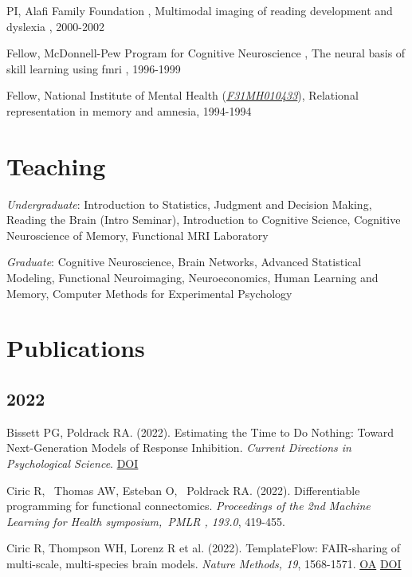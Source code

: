 \documentclass[10pt, letterpaper]{article}
\begin{document}
PI, Alafi Family Foundation , Multimodal imaging of reading development and dyslexia , 2000-2002\vspace{2mm}

Fellow, McDonnell-Pew Program for Cognitive Neuroscience , The neural basis of skill learning using fmri , 1996-1999\vspace{2mm}

Fellow, National Institute of Mental Health  (\href{http://projectreporter.nih.gov/project_info_description.cfm?aid=2241597}{\textit{F31MH010433}}), Relational representation in memory and amnesia, 1994-1994\vspace{2mm}


\section*{Teaching}
\noindent
\textit{Undergraduate}: Introduction to Statistics, Judgment and Decision Making, Reading the Brain (Intro Seminar), Introduction to Cognitive Science, Cognitive Neuroscience of Memory, Functional MRI Laboratory\vspace{2mm}

\textit{Graduate}: Cognitive Neuroscience, Brain Networks, Advanced Statistical Modeling, Functional Neuroimaging, Neuroeconomics, Human Learning and Memory, Computer Methods for Experimental Psychology\vspace{2mm}


\section*{Publications}
\noindent
\subsection*{2022}Bissett PG, Poldrack RA.  (2022). Estimating the Time to Do Nothing: Toward Next-Generation Models of Response Inhibition. \textit{Current Directions in Psychological Science}. \href{https://doi.org/10.1177/09637214221121753}{DOI} \vspace{2mm}

Ciric R,  Thomas AW, Esteban O,  Poldrack RA.  (2022). Differentiable programming for functional connectomics. \textit{Proceedings of the 2nd Machine Learning for Health symposium, PMLR , 193.0}, 419-455. \vspace{2mm}

Ciric R, Thompson WH, Lorenz R et al. (2022). TemplateFlow: FAIR-sharing of multi-scale, multi-species brain models. \textit{Nature Methods, 19}, 1568-1571. \href{https://www.ncbi.nlm.nih.gov/pmc/articles/PMC9718663}{OA} \href{https://doi.org/10.1038/s41592-022-01681-2}{DOI} \vspace{2mm}
\end{document}
